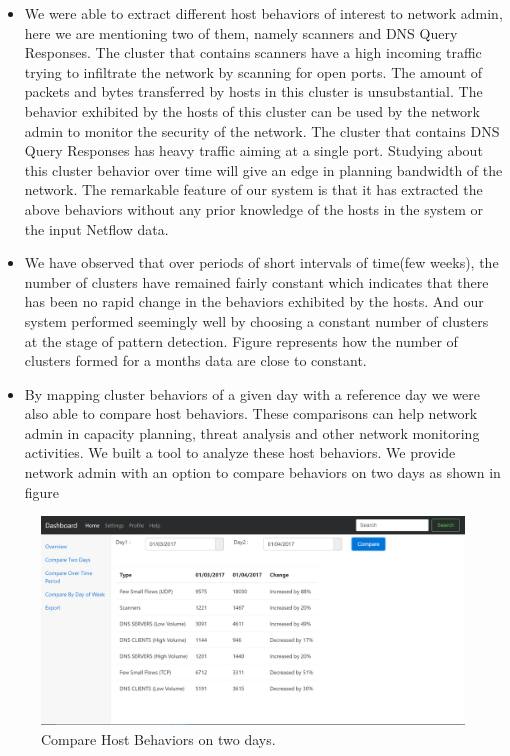 \begin{itemize}
	
	
	\item We were able to extract different host behaviors of interest to network admin, here we are mentioning two of them, namely scanners and DNS Query Responses. The cluster that contains scanners have a high incoming traffic trying to infiltrate the
	network by scanning for open ports. The amount of packets and bytes transferred by hosts in this cluster is unsubstantial. The behavior exhibited by the hosts of this
	cluster can be used by the network admin to monitor the security of the network.
	The cluster that contains DNS Query Responses has heavy traffic aiming at a single
	port. Studying about this cluster behavior over time will give an edge in planning
	bandwidth of the network. The remarkable feature of our system is that it has extracted
	the above behaviors without any prior knowledge of the hosts in the system or the input Netflow data.
	\item We have observed that over periods of short intervals of time(few weeks), the number
	of clusters have remained fairly constant which indicates that there has been no
	rapid change in the behaviors exhibited by the hosts. And our system performed
	seemingly well by choosing a constant number of clusters at the stage of pattern
	detection. Figure  represents how the number of clusters formed for a months
	data are close to constant.
	
	
	
	\item  By mapping cluster behaviors of a given day with a reference day we were also able
	to compare host behaviors. These comparisons can help network admin in capacity
	planning, threat analysis and other network monitoring activities. We built a tool to analyze these host behaviors. 
	We provide network admin with an option to compare
	behaviors on two days as shown in figure 
	
	
\end{itemize}



\begin{figure}[t]
	\centerline{\includegraphics[scale = 0.45]{tool_compare_days.png}}
	\caption{Compare Host Behaviors on two days.}%
\end{figure} 

